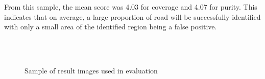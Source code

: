 \documentclass[10pt]{article}
\begin{document}
    \noindent From this sample, the mean score was 4.03 for coverage and 4.07 for purity. This indicates that on average, a large proportion of road will be successfully identified with only a small area of the identified region being a false positive.
    \begin{figure}[!h]
        \centering
        \hfill
        \\
        \hfill
        \\
        \hfill
        \caption{Sample of result images used in evaluation}
    \end{figure}
    
\printbibliography
% 
 
\end{document}
